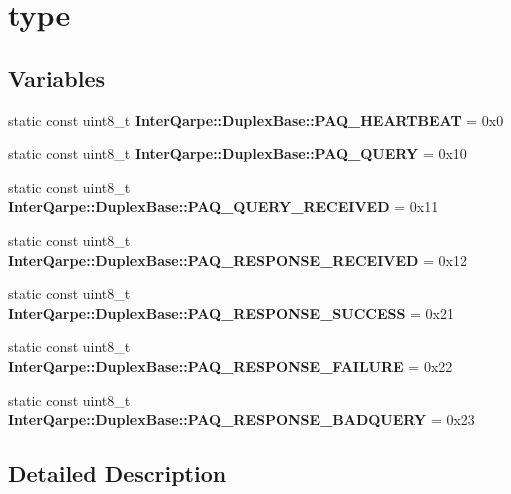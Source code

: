 \hypertarget{group__Packet}{\section{type}
\label{group__Packet}
}
\subsection*{Variables}
\begin{DoxyCompactItemize}
\item 
\hypertarget{group__Packet_gab69f9e397e49b7e4d35c9a489c25de1c}{static const uint8\+\_\+t {\bfseries Inter\+Qarpe\+::\+Duplex\+Base\+::\+P\+A\+Q\+\_\+\+H\+E\+A\+R\+T\+B\+E\+A\+T} = 0x0}\label{group__Packet_gab69f9e397e49b7e4d35c9a489c25de1c}

\item 
\hypertarget{group__Packet_ga444aacc172c0c36f34b07d2787797c2a}{static const uint8\+\_\+t {\bfseries Inter\+Qarpe\+::\+Duplex\+Base\+::\+P\+A\+Q\+\_\+\+Q\+U\+E\+R\+Y} = 0x10}\label{group__Packet_ga444aacc172c0c36f34b07d2787797c2a}

\item 
\hypertarget{group__Packet_ga93d5db22c925f7e4957d32fcae7af336}{static const uint8\+\_\+t {\bfseries Inter\+Qarpe\+::\+Duplex\+Base\+::\+P\+A\+Q\+\_\+\+Q\+U\+E\+R\+Y\+\_\+\+R\+E\+C\+E\+I\+V\+E\+D} = 0x11}\label{group__Packet_ga93d5db22c925f7e4957d32fcae7af336}

\item 
\hypertarget{group__Packet_ga4d03159262b74c2969fc9bec3cbc00bc}{static const uint8\+\_\+t {\bfseries Inter\+Qarpe\+::\+Duplex\+Base\+::\+P\+A\+Q\+\_\+\+R\+E\+S\+P\+O\+N\+S\+E\+\_\+\+R\+E\+C\+E\+I\+V\+E\+D} = 0x12}\label{group__Packet_ga4d03159262b74c2969fc9bec3cbc00bc}

\item 
\hypertarget{group__Packet_gac8a7c627e7b77f872b285d06b065c543}{static const uint8\+\_\+t {\bfseries Inter\+Qarpe\+::\+Duplex\+Base\+::\+P\+A\+Q\+\_\+\+R\+E\+S\+P\+O\+N\+S\+E\+\_\+\+S\+U\+C\+C\+E\+S\+S} = 0x21}\label{group__Packet_gac8a7c627e7b77f872b285d06b065c543}

\item 
\hypertarget{group__Packet_ga73ed12e9888ca30709f83fb7f1bac787}{static const uint8\+\_\+t {\bfseries Inter\+Qarpe\+::\+Duplex\+Base\+::\+P\+A\+Q\+\_\+\+R\+E\+S\+P\+O\+N\+S\+E\+\_\+\+F\+A\+I\+L\+U\+R\+E} = 0x22}\label{group__Packet_ga73ed12e9888ca30709f83fb7f1bac787}

\item 
\hypertarget{group__Packet_gacbae25852f1bb51475c03dd048005633}{static const uint8\+\_\+t {\bfseries Inter\+Qarpe\+::\+Duplex\+Base\+::\+P\+A\+Q\+\_\+\+R\+E\+S\+P\+O\+N\+S\+E\+\_\+\+B\+A\+D\+Q\+U\+E\+R\+Y} = 0x23}\label{group__Packet_gacbae25852f1bb51475c03dd048005633}

\end{DoxyCompactItemize}


\subsection{Detailed Description}
